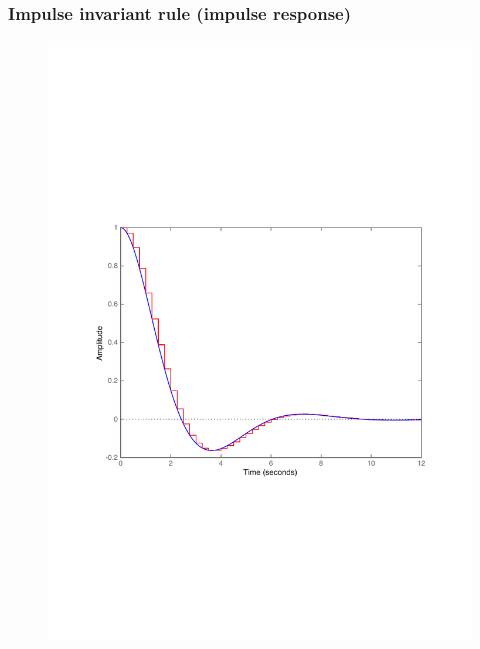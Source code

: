 \begin{frame}
	\frametitle{Impulse invariant rule (impulse response)}
	\vspace{-0.7em}
	\begin{figure}
		\centering
		\includegraphics[width=0.8\linewidth]{vb3I}
	\end{figure}
\end{frame}

